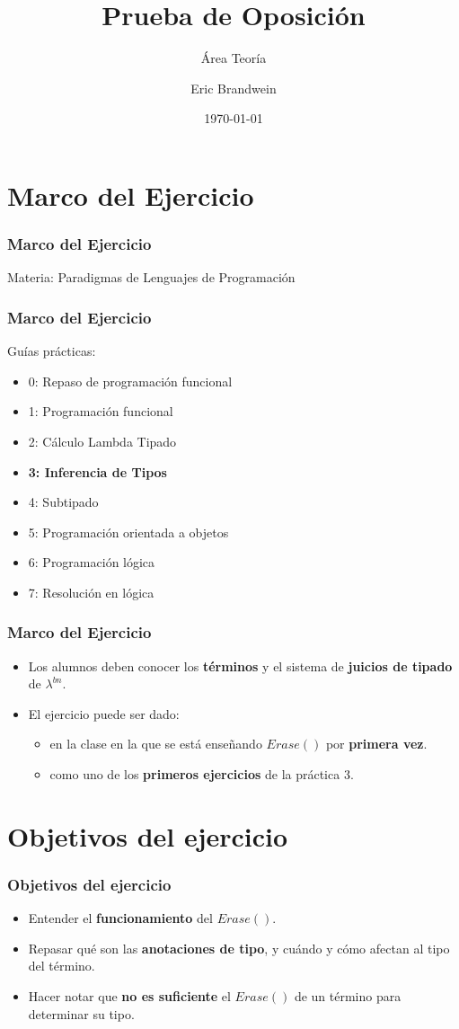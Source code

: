 \documentclass{beamer}
\title{Prueba de Oposición}
\subtitle{Área Teoría}
\institute{Universidad de Buenos Aries, FCEyN}
\author{Eric Brandwein}
\date{\today}
\begin{document}
\frame{\titlepage}

\section{Marco del Ejercicio}
\begin{frame}
\frametitle{Marco del Ejercicio}

Materia: Paradigmas de Lenguajes de Programación

\end{frame}

\begin{frame}
\frametitle{Marco del Ejercicio}
Guías prácticas:
\begin{itemize}
    \item 0: Repaso de programación funcional
    \item 1: Programación funcional
    \item 2: Cálculo Lambda Tipado
    \item \textbf{3: Inferencia de Tipos}
    \item 4: Subtipado
    \item 5: Programación orientada a objetos
    \item 6: Programación lógica
    \item 7: Resolución en lógica
\end{itemize}
\end{frame}


\begin{frame}
\frametitle{Marco del Ejercicio}

\begin{itemize}
    \item Los alumnos deben conocer los \textbf{términos}
        y el sistema de \textbf{juicios de tipado}
        de $\lambda^{bn}$.
    \item El ejercicio puede ser dado:
    \begin{itemize}
        \item en la clase en la que se está enseñando
            $Erase()$ por \textbf{primera vez}.
        \item como uno de los \textbf{primeros ejercicios} de
            la práctica 3.
    \end{itemize}
\end{itemize}
\end{frame}

\section{Objetivos del ejercicio}
\begin{frame}
\frametitle{Objetivos del ejercicio}
\begin{itemize}
    \item Entender el \textbf{funcionamiento} del $Erase()$.
    \item Repasar qué son las \textbf{anotaciones de tipo},
        y cuándo y cómo afectan al tipo del término.
    \item Hacer notar que \textbf{no es suficiente} el
        $Erase()$ de un término para determinar su tipo.
\end{itemize}
\end{frame}
\end{document}
